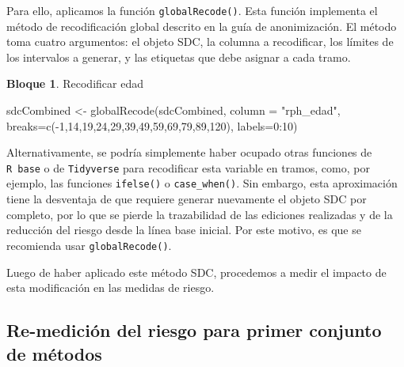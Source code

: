 \documentclass[
]{book}
\newenvironment{Shaded}{\begin{snugshade}}{\end{snugshade}}
\newcommand{\AttributeTok}[1]{\textcolor[rgb]{0.77,0.63,0.00}{#1}}
\newcommand{\DecValTok}[1]{\textcolor[rgb]{0.00,0.00,0.81}{#1}}
\newcommand{\FunctionTok}[1]{\textcolor[rgb]{0.00,0.00,0.00}{#1}}
\newcommand{\NormalTok}[1]{#1}
\newcommand{\OtherTok}[1]{\textcolor[rgb]{0.56,0.35,0.01}{#1}}
\newcommand{\SpecialCharTok}[1]{\textcolor[rgb]{0.00,0.00,0.00}{#1}}
\newcommand{\StringTok}[1]{\textcolor[rgb]{0.31,0.60,0.02}{#1}}
\theoremstyle{definition}
\theoremstyle{definition}
\newtheorem{example}{Bloque}[chapter]
\theoremstyle{definition}
\theoremstyle{definition}
\theoremstyle{remark}
\begin{document}
Para ello, aplicamos la función \texttt{globalRecode()}. Esta función implementa el método de recodificación global descrito en la guía de anonimización. El método toma cuatro argumentos: el objeto SDC, la columna a recodificar, los límites de los intervalos a generar, y las etiquetas que debe asignar a cada tramo.

\begin{example}
\protect\hypertarget{exm:bloque53nbm}{}\label{exm:bloque53nbm}Recodificar edad
\end{example}

\begin{Shaded}
\begin{Highlighting}[]
\NormalTok{sdcCombined }\OtherTok{\textless{}{-}} \FunctionTok{globalRecode}\NormalTok{(sdcCombined,}
                            \AttributeTok{column =} \StringTok{"rph\_edad"}\NormalTok{,}
                            \AttributeTok{breaks=}\FunctionTok{c}\NormalTok{(}\SpecialCharTok{{-}}\DecValTok{1}\NormalTok{,}\DecValTok{14}\NormalTok{,}\DecValTok{19}\NormalTok{,}\DecValTok{24}\NormalTok{,}\DecValTok{29}\NormalTok{,}\DecValTok{39}\NormalTok{,}\DecValTok{49}\NormalTok{,}\DecValTok{59}\NormalTok{,}\DecValTok{69}\NormalTok{,}\DecValTok{79}\NormalTok{,}\DecValTok{89}\NormalTok{,}\DecValTok{120}\NormalTok{),}
                            \AttributeTok{labels=}\DecValTok{0}\SpecialCharTok{:}\DecValTok{10}\NormalTok{)}
\end{Highlighting}
\end{Shaded}

Alternativamente, se podría simplemente haber ocupado otras funciones de \texttt{R\ base} o de \texttt{Tidyverse} para recodificar esta variable en tramos, como, por ejemplo, las funciones \texttt{ifelse()} o \texttt{case\_when()}. Sin embargo, esta aproximación tiene la desventaja de que requiere generar nuevamente el objeto SDC por completo, por lo que se pierde la trazabilidad de las ediciones realizadas y de la reducción del riesgo desde la línea base inicial. Por este motivo, es que se recomienda usar \texttt{globalRecode()}.

Luego de haber aplicado este método SDC, procedemos a medir el impacto de esta modificación en las medidas de riesgo.

\hypertarget{re-mediciuxf3n-del-riesgo-para-primer-conjunto-de-muxe9todos}{%
\subsection{Re-medición del riesgo para primer conjunto de métodos}\label{re-mediciuxf3n-del-riesgo-para-primer-conjunto-de-muxe9todos}}
\end{document}
